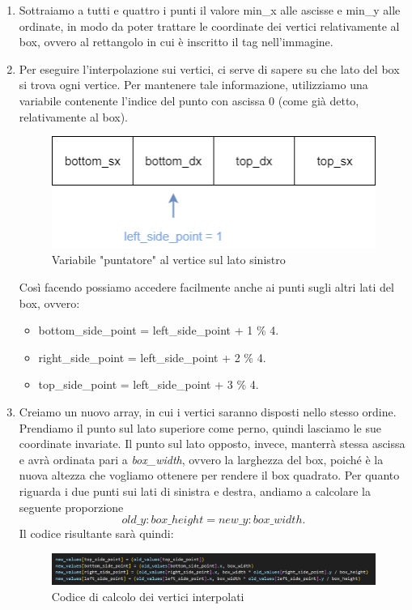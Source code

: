\documentclass[]{article}
\begin{document}
\begin{enumerate}
    \item Sottraiamo a tutti e quattro i punti il valore min\_x alle ascisse e min\_y alle ordinate, in modo da poter trattare le coordinate dei vertici relativamente al box, ovvero al rettangolo in cui è inscritto il tag nell'immagine.
    \item Per eseguire l'interpolazione sui vertici, ci serve di sapere su che lato del box si trova ogni vertice. Per mantenere tale informazione, utilizziamo una variabile contenente l'indice del punto con ascissa 0 (come già detto, relativamente al box).
        \begin{figure}[H]
            \centering
            \includegraphics[width=0.5\linewidth]{immagini/array_vertici_puntatore.png}
            \caption{Variabile "puntatore" al vertice sul lato sinistro}
        \end{figure}
          Così facendo possiamo accedere facilmente anche ai punti sugli altri lati del box, ovvero:
          \begin{itemize}
              \item bottom\_side\_point = left\_side\_point + 1 \% 4.
              \item right\_side\_point = left\_side\_point + 2 \% 4.
              \item top\_side\_point = left\_side\_point + 3 \% 4.
          \end{itemize}
    \item Creiamo un nuovo array, in cui i vertici saranno disposti nello stesso ordine. Prendiamo il punto sul lato superiore come perno, quindi lasciamo le sue coordinate invariate. Il punto sul lato opposto, invece, manterrà stessa ascissa e avrà ordinata pari a \textit{box\_width}, ovvero la larghezza del box, poiché è la nuova altezza che vogliamo ottenere per rendere il box quadrato. Per quanto riguarda i due punti sui lati di sinistra e destra, andiamo a calcolare la seguente proporzione $$old\_y : box\_height = new\_y : box\_width.$$
          Il codice risultante sarà quindi:


          \begin{figure}[H]
            \centering
            \includegraphics[width=\linewidth]{immagini/codice_interpolazione_vertici.png}
            \caption{Codice di calcolo dei vertici interpolati}
        \end{figure}



\end{enumerate}
\end{document}
